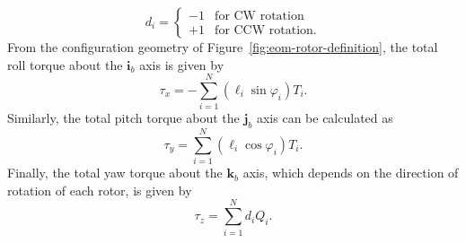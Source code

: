 %
%
\begin{equation}
   d_i = 
   \begin{cases}
      -1 	& \text{for CW rotation} \\
      +1 	& \text{for CCW rotation} .
   \end{cases}
\end{equation}
%
From the configuration geometry of Figure~\ref{fig:eom-rotor-definition}, the total roll torque about the $\mathbf{i}_b$ axis is given by
\begin{equation}
   \tau_x = - \sum\limits_{i=1}^N \left( \ell_i \sin \varphi_i \right) T_i .
\end{equation}
Similarly, the total pitch torque about the $\mathbf{j}_b$ axis can be calculated as
\begin{equation}
   \tau_y = \sum\limits_{i=1}^N \left( \ell_i \cos \varphi_i \right) T_i .
\end{equation}
Finally, the total yaw torque about the $\mathbf{k}_b$ axis, which depends on the direction of rotation of each rotor, is given by
\begin{equation}
   \tau_z = \sum\limits_{i=1}^N d_i Q_i .
\end{equation}
%
%
%
%

